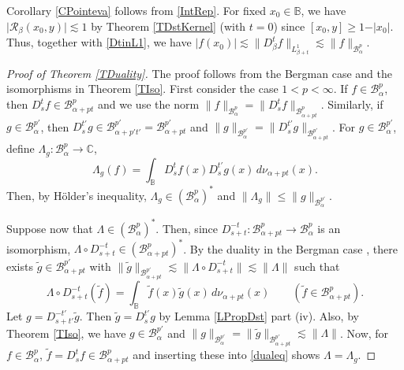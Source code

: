 \documentclass{amsart}
\theoremstyle{definition}
\theoremstyle{remark}
\begin{document}
Corollary \ref{CPointeva} follows from \eqref{IntRep}.
For fixed $x_0\in\mathbb B$, we have
$\vert\mathcal R_\beta(x_0,y)\vert\lesssim 1$ by Theorem \ref{TDstKernel}
(with $t=0$) since $[x_0,y]\ge 1-\vert x_0\vert$.
Thus, together with \eqref{DtinL1}, we have
$\vert f(x_0)\vert\lesssim \|D^t_\beta f\|_{L^1_{\beta+t}}
\lesssim\|f\|_{\mathcal B^p_\alpha}$.

\begin{proof}[Proof of Theorem \ref{TDuality}]
The proof follows from the Bergman case and the isomorphisms in
Theorem \ref{TIso}.
First consider the case $1<p<\infty$.
If $f\in\mathcal B^p_\alpha$, then $D^t_s f\in\mathcal B^p_{\alpha+pt}$
and we use the norm
$\|f\|_{\mathcal B^p_\alpha}=\|D^t_s f\|_{\mathcal B^p_{\alpha+pt}}$.
Similarly, if $g\in\mathcal B^{p'}_\alpha$, then
$D^{t'}_s g\in\mathcal B^{p'}_{\alpha+p't'}=\mathcal B^{p'}_{\alpha+pt}$
and
$\|g\|_{\mathcal B^{p'}_\alpha}=\|D^{t'}_s g\|_{\mathcal B^{p'}_{\alpha+pt}}$.
For $g\in\mathcal B^{p'}_\alpha$,
define $\Lambda_g\colon \mathcal B^p_\alpha\to\mathbb C$,
\begin{equation*}
\Lambda_g(f)=\int_{\mathbb B}
D^t_s f(x) D^{t'}_s g(x)\,d\nu_{\alpha+pt}(x).
\end{equation*}
Then, by H\"older's inequality, $\Lambda_g\in(\mathcal B^p_\alpha)^*$ and
$\|\Lambda_g\|\le\|g\|_{\mathcal B^{p'}_\alpha}$.

Suppose now that $\Lambda\in(\mathcal B^p_\alpha)^*$.
Then, since $D^{-t}_{s+t}\colon\mathcal B^p_{\alpha+pt}\to\mathcal B^p_\alpha$
is an isomorphism, $\Lambda\circ D^{-t}_{s+t}\in(\mathcal B^p_{\alpha+pt})^*$.
By the duality in the Bergman case \cite[Corollary 1.4]{U}, there exists
$\tilde{g}\in\mathcal B^{p'}_{\alpha+pt}$ with
$\|\tilde{g}\|_{\mathcal B^{p'}_{\alpha+pt}}
\lesssim\|\Lambda\circ  D^{-t}_{s+t}\|
\lesssim \|\Lambda\|$ such that
\begin{equation}\label{dualeq}
\Lambda\circ D^{-t}_{s+t}(\tilde{f})
=\int_{\mathbb B}\tilde{f}(x)\tilde{g}(x)\,d\nu_{\alpha+pt}(x)
\qquad (\tilde{f}\in\mathcal B^p_{\alpha+pt}).
\end{equation}
Let $g=D^{-t'}_{s+t'}\tilde{g}$.
Then $\tilde{g}=D^{t'}_{s}g$ by Lemma \ref{LPropDst} part (iv).
Also, by Theorem \ref{TIso}, we have $g\in\mathcal B^{p'}_\alpha$ and
$\|g\|_{\mathcal B^{p'}_{\alpha}}
=\|\tilde{g}\|_{\mathcal B^{p'}_{\alpha+pt}}\lesssim\|\Lambda\|$.
Now, for $f\in\mathcal B^p_\alpha$,
$\tilde{f}=D^t_s f\in\mathcal B^p_{\alpha+pt}$
and inserting these into \eqref{dualeq} shows $\Lambda=\Lambda_g$.


\end{proof}
\end{document}
